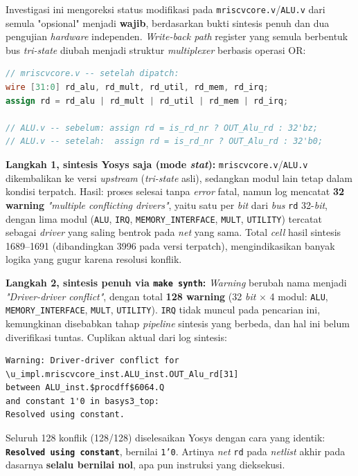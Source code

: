 Investigasi ini mengoreksi status modifikasi pada \texttt{mriscvcore.v}/\texttt{ALU.v} dari semula "opsional" menjadi \textbf{wajib}, berdasarkan bukti sintesis penuh dan dua pengujian \textit{hardware} independen. \textit{Write-back path} register yang semula berbentuk bus \textit{tri-state} diubah menjadi struktur \textit{multiplexer} berbasis operasi OR:

\begin{lstlisting}[language=Verilog]
// mriscvcore.v -- setelah dipatch:
wire [31:0] rd_alu, rd_mult, rd_util, rd_mem, rd_irq;
assign rd = rd_alu | rd_mult | rd_util | rd_mem | rd_irq;

// ALU.v -- sebelum: assign rd = is_rd_nr ? OUT_Alu_rd : 32'bz;
// ALU.v -- setelah:  assign rd = is_rd_nr ? OUT_Alu_rd : 32'b0;
\end{lstlisting}

\textbf{Langkah 1, sintesis Yosys saja (mode \textit{stat}):} \texttt{mriscvcore.v}/\texttt{ALU.v} dikembalikan ke versi \textit{upstream} (\textit{tri-state} asli), sedangkan modul lain tetap dalam kondisi terpatch. Hasil: proses selesai tanpa \textit{error} fatal, namun log mencatat \textbf{32 warning} \textit{"multiple conflicting drivers"}, yaitu satu per \textit{bit} dari \textit{bus} \texttt{rd} 32-\textit{bit}, dengan lima modul (\texttt{ALU}, \texttt{IRQ}, \texttt{MEMORY\_INTERFACE}, \texttt{MULT}, \texttt{UTILITY}) tercatat sebagai \textit{driver} yang saling bentrok pada \textit{net} yang sama. Total \textit{cell} hasil sintesis 1689--1691 (dibandingkan 3996 pada versi terpatch), mengindikasikan banyak logika yang gugur karena resolusi konflik.

\textbf{Langkah 2, sintesis penuh via \texttt{make synth}:} \textit{Warning} berubah nama menjadi \textit{"Driver-driver conflict"}, dengan total \textbf{128 warning} (32 \textit{bit} $\times$ 4 modul: \texttt{ALU}, \texttt{MEMORY\_INTERFACE}, \texttt{MULT}, \texttt{UTILITY}). \texttt{IRQ} tidak muncul pada pencarian ini, kemungkinan disebabkan tahap \textit{pipeline} sintesis yang berbeda, dan hal ini belum diverifikasi tuntas. Cuplikan aktual dari log sintesis:

\begin{verbatim}
Warning: Driver-driver conflict for
\u_impl.mriscvcore_inst.ALU_inst.OUT_Alu_rd[31]
between ALU_inst.$procdff$6064.Q
and constant 1'0 in basys3_top:
Resolved using constant.
\end{verbatim}

Seluruh 128 konflik (128/128) diselesaikan Yosys dengan cara yang identik: \textbf{\texttt{Resolved using constant}}, bernilai \texttt{1'0}. Artinya \textit{net} \texttt{rd} pada \textit{netlist} akhir pada dasarnya \textbf{selalu bernilai nol}, apa pun instruksi yang dieksekusi.

